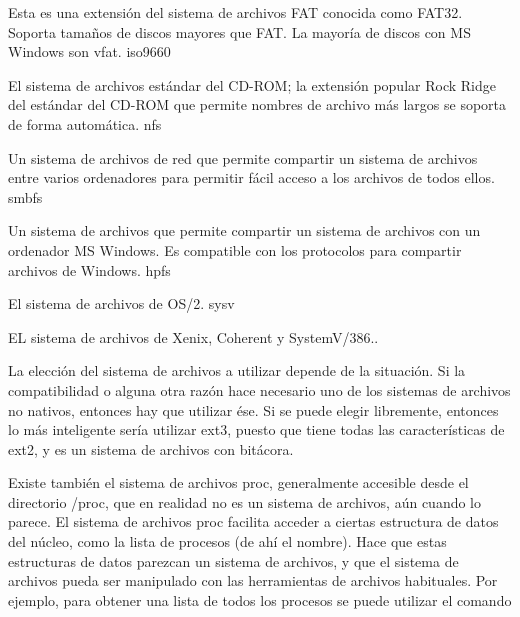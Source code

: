 \documentclass[12pt]{article}
\begin{document}
    Esta es una extensión del sistema de archivos FAT conocida como FAT32. Soporta tamaños de discos mayores que FAT. La mayoría de discos con MS Windows son vfat.
iso9660

    El sistema de archivos estándar del CD-ROM; la extensión popular Rock Ridge del estándar del CD-ROM que permite nombres de archivo más largos se soporta de forma automática.
nfs

    Un sistema de archivos de red que permite compartir un sistema de archivos entre varios ordenadores para permitir fácil acceso a los archivos de todos ellos.
smbfs

    Un sistema de archivos que permite compartir un sistema de archivos con un ordenador MS Windows. Es compatible con los protocolos para compartir archivos de Windows.
hpfs

    El sistema de archivos de OS/2.
sysv

    EL sistema de archivos de Xenix, Coherent y SystemV/386..

La elección del sistema de archivos a utilizar depende de la situación. Si la compatibilidad o alguna otra razón hace necesario uno de los sistemas de archivos no nativos, entonces hay que utilizar ése. Si se puede elegir libremente, entonces lo más inteligente sería utilizar ext3, puesto que tiene todas las características de ext2, y es un sistema de archivos con bitácora.

Existe también el sistema de archivos proc, generalmente accesible desde el directorio /proc, que en realidad no es un sistema de archivos, aún cuando lo parece. El sistema de archivos proc facilita acceder a ciertas estructura de datos del núcleo, como la lista de procesos (de ahí el nombre). Hace que estas estructuras de datos parezcan un sistema de archivos, y que el sistema de archivos pueda ser manipulado con las herramientas de archivos habituales. Por ejemplo, para obtener una lista de todos los procesos se puede utilizar el comando
\end{document}
